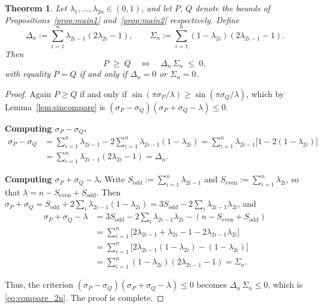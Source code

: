 \documentclass[12pt]{amsart}
\newtheorem{theorem}{Theorem}[section]
\theoremstyle{definition}
\begin{document}
\begin{theorem}\label{thm:compare_2n}
Let $\lambda_1,\ldots,\lambda_{2n}\in(0,1)$, and let $P$, $Q$ denote
the bounds of Propositions~\ref{prop:main1} and~\ref{prop:main2}
respectively.  Define
\begin{equation}\label{eq:Delta_n}
  \Delta_n := \sum_{i=1}^{n}\lambda_{2i-1}(2\lambda_{2i}-1),
  \qquad
  \Sigma_n := \sum_{i=1}^{n}(1-\lambda_{2i})(2\lambda_{2i-1}-1).
\end{equation}
Then
\begin{equation}\label{eq:compare_2n}
  P \;\geq\; Q
  \quad\Longleftrightarrow\quad
  \Delta_n\,\Sigma_n \;\leq\; 0,
\end{equation}
with equality $P=Q$ if and only if $\Delta_n=0$ or $\Sigma_n=0$.
\end{theorem}

\begin{proof}
Again $P\geq Q$ if and only if $\sin(\pi\sigma_P/\lambda)\geq\sin(\pi\sigma_Q/\lambda)$,
which by Lemma~\ref{lem:sincompare} is
$(\sigma_P-\sigma_Q)(\sigma_P+\sigma_Q-\lambda)\leq 0$.

\medskip
\noindent\textbf{Computing $\sigma_P-\sigma_Q$.}
\begin{align*}
  \sigma_P-\sigma_Q
  &=\sum_{i=1}^n\lambda_{2i-1}-2\sum_{i=1}^n\lambda_{2i-1}(1-\lambda_{2i})
  =\sum_{i=1}^n\lambda_{2i-1}\bigl[1-2(1-\lambda_{2i})\bigr]\\
  &=\sum_{i=1}^n\lambda_{2i-1}(2\lambda_{2i}-1)
  =\Delta_n.
\end{align*}

\medskip
\noindent\textbf{Computing $\sigma_P+\sigma_Q-\lambda$.}
Write $S_{\mathrm{odd}}:=\sum_{i=1}^n\lambda_{2i-1}$ and
$S_{\mathrm{even}}:=\sum_{i=1}^n\lambda_{2i}$, so that
$\lambda=n-S_{\mathrm{even}}+S_{\mathrm{odd}}$.  Then
$\sigma_P+\sigma_Q=S_{\mathrm{odd}}+2\sum_i\lambda_{2i-1}(1-\lambda_{2i})
=3S_{\mathrm{odd}}-2\sum_i\lambda_{2i-1}\lambda_{2i}$, and
\begin{align*}
  \sigma_P+\sigma_Q-\lambda
  &=3S_{\mathrm{odd}}-2\sum_i\lambda_{2i-1}\lambda_{2i}
    -(n-S_{\mathrm{even}}+S_{\mathrm{odd}})\\
  &=\sum_{i=1}^n\bigl[2\lambda_{2i-1}+\lambda_{2i}-1
    -2\lambda_{2i-1}\lambda_{2i}\bigr]\\
  &=\sum_{i=1}^n\bigl[2\lambda_{2i-1}(1-\lambda_{2i})-(1-\lambda_{2i})\bigr]\\
  &=\sum_{i=1}^n(1-\lambda_{2i})(2\lambda_{2i-1}-1)
  =\Sigma_n.
\end{align*}

\medskip
Thus, the criterion $(\sigma_P-\sigma_Q)(\sigma_P+\sigma_Q-\lambda)\leq 0$
becomes $\Delta_n\,\Sigma_n\leq 0$, which is \eqref{eq:compare_2n}. The proof is complete.
\end{proof}
\end{document}
